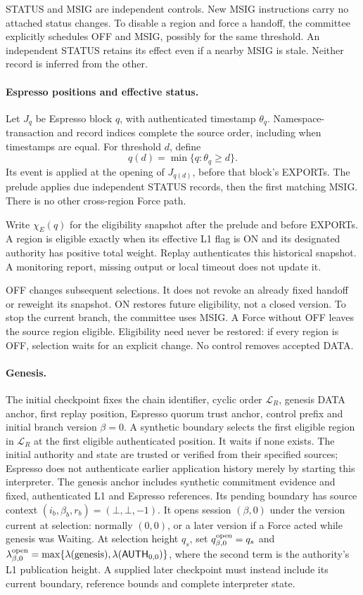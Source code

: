 \documentclass[11pt,a4paper]{article}
\newcommand{\tagg}[1]{\ensuremath{\mathsf{#1}}}
\begin{document}
STATUS and MSIG are independent controls. New MSIG instructions carry
no attached status changes. To disable a region and force a handoff,
the committee explicitly schedules OFF and MSIG, possibly for the same
threshold. An independent STATUS retains its effect even if a nearby
MSIG is stale. Neither record is inferred from the other.

\paragraph{Espresso positions and effective status.}
Let $J_q$ be Espresso block $q$, with authenticated timestamp $\theta_q$.
Namespace-transaction and record indices complete the source order,
including when timestamps are equal. For threshold $d$, define
\[
 q(d)=\min\{q:\theta_q\ge d\}.
\]
Its event is applied at the opening of $J_{q(d)}$, before that block's
EXPORTs. The prelude applies due independent STATUS records, then the
first matching MSIG. There is no other cross-region Force path.

Write $\chi_E(q)$ for the eligibility snapshot after the prelude and
before EXPORTs. A region is eligible exactly when its effective L1
flag is ON and its designated authority has positive total weight.
Replay authenticates this historical snapshot. A monitoring report,
missing output or local timeout does not update it.

OFF changes subsequent selections. It does not revoke an already fixed
handoff or reweight its snapshot. ON restores future eligibility, not a
closed version. To stop the current branch, the committee uses MSIG.
A Force without OFF leaves the source region eligible.
Eligibility need never be restored: if every region is OFF, selection
waits for an explicit change. No control removes accepted DATA.

\paragraph{Genesis.}
The initial checkpoint fixes the chain identifier, cyclic order
$\mathcal L_R$, genesis DATA anchor, first replay position, Espresso
quorum trust anchor, control prefix and initial branch version $\beta=0$.
A synthetic boundary selects the first eligible region in
$\mathcal L_R$ at the first eligible authenticated position. It waits
if none exists. The initial authority and state are trusted or verified
from their specified sources; Espresso does not authenticate earlier
application history merely by starting this interpreter.
The genesis anchor includes synthetic commitment evidence and fixed,
authenticated L1 and Espresso references. Its pending boundary has
source context $(i_b,\beta_b,r_b)=(\bot,\bot,-1)$. It opens
session $(\beta,0)$ under the version current at selection: normally
$(0,0)$, or a later version if a Force acted while genesis was Waiting.
At selection height $q_s$, set $q^{\rm open}_{\beta,0}=q_s$ and
$\lambda^{\rm open}_{\beta,0}=\max\{\lambda(\text{genesis}),
\lambda(\tagg{AUTH}_{0,0})\}$, where the second term is the authority's
L1 publication height. A supplied later checkpoint must instead include
its current boundary, reference bounds and complete interpreter state.
\end{document}
